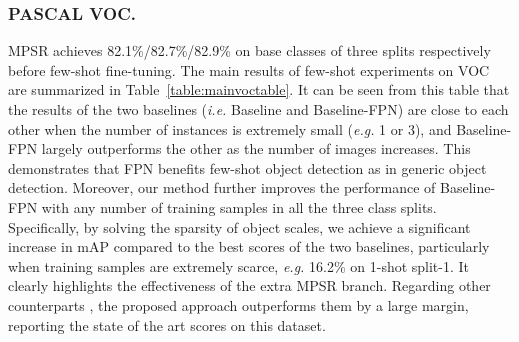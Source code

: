 \documentclass[runningheads]{llncs}
\begin{document}
\subsubsection{PASCAL VOC.}
 MPSR achieves 82.1\%/82.7\%/82.9\% on base classes of three splits respectively before few-shot fine-tuning.
The main results of few-shot experiments on VOC are summarized in Table~\ref{table:mainvoctable}.
It can be seen from this table that the results of the two baselines (\emph{i.e.} Baseline and Baseline-FPN) are close to each other when the number of instances is extremely small (\emph{e.g.} 1 or 3), and Baseline-FPN largely outperforms the other as the number of images increases. 
This demonstrates that FPN benefits few-shot object detection as in generic object detection. 
Moreover, our method further improves the performance of Baseline-FPN with any number of training samples in all the three class splits.
Specifically, by solving the sparsity of object scales, we achieve a significant increase in mAP compared to the best scores of the two baselines, particularly when training samples are extremely scarce, \emph{e.g.} 16.2\% on 1-shot split-1. 
It clearly highlights the effectiveness of the extra MPSR branch. Regarding other counterparts \cite{yolore,metarcnn}, the proposed approach outperforms them by a large margin, reporting the state of the art scores on this dataset.
\end{document}
